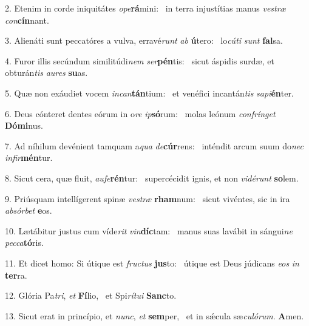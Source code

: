 2. Etenim in corde iniquitátes \textit{o}\textit{pe}\textbf{rá}mini: \ast\  in terra injustítias manus \textit{ves}\textit{træ} \textit{con}\textbf{cín}nant.\

3. Alienáti sunt peccatóres a vulva, erravé\textit{runt} \textit{ab} \textbf{ú}tero: \ast\  lo\textit{cú}\textit{ti} \textit{sunt} \textbf{fal}sa.\

4. Furor illis secúndum similitúdi\textit{nem} \textit{ser}\textbf{pén}tis: \ast\  sicut áspidis surdæ, et obturán\textit{tis} \textit{au}\textit{res} \textbf{su}as.\

5. Quæ non exáudiet vocem \textit{in}\textit{can}\textbf{tán}tium: \ast\  et venéfici incantán\textit{tis} \textit{sa}\textit{pi}\textbf{én}ter.\

6. Deus cónteret dentes eórum in o\textit{re} \textit{ip}\textbf{só}rum: \ast\  molas leónum \textit{con}\textit{frín}\textit{get} \textbf{Dó}\textbf{mi}nus.\

7. Ad níhilum devénient tamquam a\textit{qua} \textit{de}\textbf{cúr}rens: \ast\  inténdit arcum suum do\textit{nec} \textit{in}\textit{fir}\textbf{mén}tur.\

8. Sicut cera, quæ fluit, \textit{au}\textit{fe}\textbf{rén}tur: \ast\  supercécidit ignis, et non \textit{vi}\textit{dé}\textit{runt} \textbf{so}lem.\

9. Priúsquam intellígerent spinæ \textit{ves}\textit{træ} \textbf{rham}num: \ast\  sicut vivéntes, sic in ira \textit{ab}\textit{sór}\textit{bet} \textbf{e}os.\

10. Lætábitur justus cum víde\textit{rit} \textit{vin}\textbf{díc}tam: \ast\  manus suas lavábit in sángui\textit{ne} \textit{pec}\textit{ca}\textbf{tó}ris.\

11. Et dicet homo: Si útique est \textit{fruc}\textit{tus} \textbf{jus}to: \ast\  útique est Deus júdicans \textit{e}\textit{os} \textit{in} \textbf{ter}ra.\

12. Glória Pa\textit{tri}, \textit{et} \textbf{Fí}lio, \ast\  et Spi\textit{rí}\textit{tu}\textit{i} \textbf{Sanc}to.\

13. Sicut erat in princípio, et \textit{nunc}, \textit{et} \textbf{sem}per, \ast\  et in sǽcula sæ\textit{cu}\textit{ló}\textit{rum}. \textbf{A}men.\

